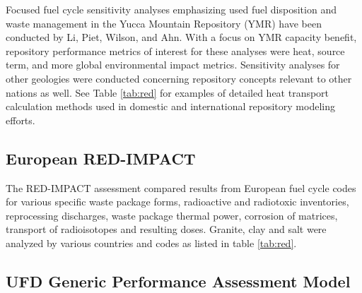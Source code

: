 Focused fuel cycle sensitivity analyses emphasizing used fuel disposition and
waste management in the Yucca Mountain Repository (YMR) have been conducted by
Li, Piet, Wilson, and Ahn. With a focus on YMR capacity benefit, repository
performance metrics of interest for these analyses were heat, source term, and
more global environmental impact metrics.  Sensitivity analyses for other
geologies were conducted concerning repository concepts relevant to other
nations as well. See Table \ref{tab:red} for examples of detailed heat transport 
calculation methods used in domestic and international repository modeling 
efforts.

\subsection{European RED-IMPACT} 

The RED-IMPACT assessment compared
results from European fuel cycle codes for various specific waste package
forms, radioactive and radiotoxic inventories, reprocessing discharges,  waste
package thermal power, corrosion of matrices, transport of radioisotopes and
resulting doses.  Granite, clay and salt were analyzed by various countries and 
codes as listed in table \ref{tab:red}.







\subsection{UFD Generic Performance Assessment Model}

